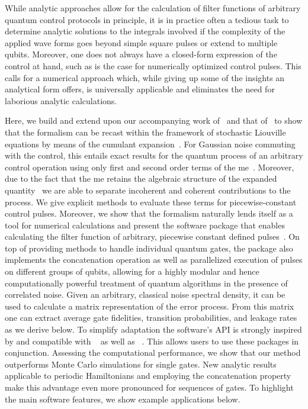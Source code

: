 While analytic approaches allow for the calculation of filter functions of arbitrary quantum control protocols in principle, it is in practice often a tedious task to determine analytic solutions to the integrals involved if the complexity of the applied wave forms goes beyond simple square pulses or extend to multiple qubits.
Moreover, one does not always have a closed-form expression of the control at hand, such as is the case for numerically optimized control pulses.
This calls for a numerical approach which, while giving up some of the insights an analytical form offers, is universally applicable and eliminates the need for laborious analytic calculations.

Here, we build and extend upon our accompanying work of~ and that of~ to show that the formalism can be recast within the framework of stochastic Liouville equations by means of the cumulant expansion~\cite{Kubo1962,Kubo1963,Fox1976,Bianucci2020}.
For Gaussian noise commuting with the control, this entails exact results for the quantum process of an arbitrary control operation using only first and second order terms of the \gls{me}~\cite{Magnus1954}.
Moreover, due to the fact that the \gls{me} retains the algebraic structure of the expanded quantity~\cite{Blanes2009} we are able to separate incoherent and coherent contributions to the process.
We give explicit methods to evaluate these terms for piecewise-constant control pulses.
Moreover, we show that the formalism naturally lends itself as a tool for numerical calculations and present the \filterfunctions \python software package that enables calculating the filter function of arbitrary, piecewise constant defined pulses~\cite{Hangleiter_ff}.
On top of providing methods to handle individual quantum gates, the package also implements the concatenation operation as well as parallelized execution of pulses on different groups of qubits, allowing for a highly modular and hence computationally powerful treatment of quantum algorithms in the presence of correlated noise.
Given an arbitrary, classical noise spectral density, it can be used to calculate a matrix representation of the error process.
From this matrix one can extract average gate fidelities, transition probabilities, and leakage rates as we derive below.
To simplify adaptation the software's API is strongly inspired by and compatible with \qutip~\cite{Johansson2012} as well as \qopt~\cite{Teske2021,Teske2022}.
This allows users to use these packages in conjunction.
Assessing the computational performance, we show that our method outperforms Monte Carlo simulations for single gates.
New analytic results applicable to periodic Hamiltonians and employing the concatenation property make this advantage even more pronounced for sequences of gates.
To highlight the main software features, we show example applications below.

